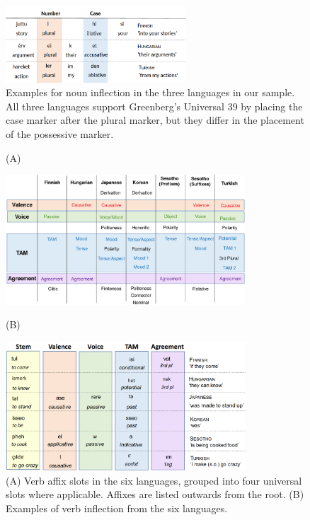 \documentclass[man]{apa7}
\begin{document}
\begin{figure}
	\begin{center}
\includegraphics[width=0.6\textwidth]{figures/noun-slots.png}
	\end{center}
\caption{Examples for noun inflection in the three languages in our sample. All three languages support Greenberg's Universal 39 by placing the case marker after the plural marker, but they differ in the placement of the possessive marker.}\label{fig:noun-inflection}
\end{figure}


%





\begin{figure} 
	\begin{center}
		(A)

	 \includegraphics[width=0.8\textwidth]{figures/verb-slots.png}

		(B)

\includegraphics[width=0.8\textwidth]{figures/examples-slots.png}
\end{center}
 

	\caption{(A) Verb affix slots in the six languages, grouped into four universal slots where applicable. Affixes are listed outwards from the root.
	(B) Examples of verb inflection from the six languages. }\label{tab:examples-verbs}\label{tab:examples-verbs}
\end{figure}
 
\end{document}
